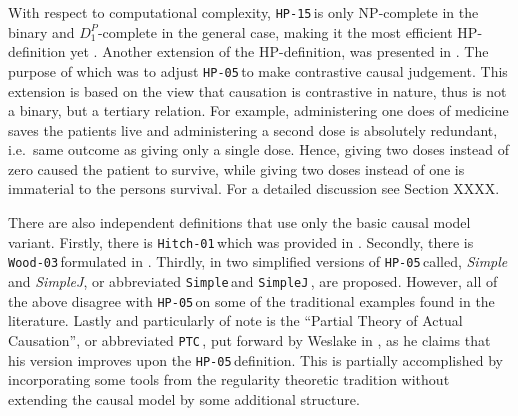 \documentclass[11pt,a4paper]{book}
\theoremstyle{definition}
\theoremstyle{definition}
\theoremstyle{definition}
\theoremstyle{remark}
\newcommand{\hitch}{\texttt{Hitch-01}\,}
\newcommand{\wood}{\texttt{Wood-03}\,}
\newcommand{\hpu}{\texttt{HP-05}\,}
\newcommand{\simple}{\texttt{Simple}\,}
\newcommand{\simplej}{\texttt{SimpleJ}\,}
\newcommand{\ptc}{\texttt{PTC}\,}
\newcommand{\hpm}{\texttt{HP-15}\,}
\begin{document}
With respect to computational complexity, \hpm is only NP-complete in the binary and $D_1^P$-complete in the general case, making it the most efficient HP-definition yet \parencite[p.~153-154]{halpern2016actual}.
Another extension of the HP-definition, was presented in \parencite{fenton2017proposed}. The purpose of which was to adjust \hpu to make contrastive causal judgement.
This extension is based on the view that causation is contrastive in nature, thus is not a binary, but a tertiary relation. For example, administering one does of medicine saves the patients live and administering a second dose is absolutely redundant, i.e.\ same outcome as giving only a single dose. Hence, giving two doses instead of zero caused the patient to survive, while giving two doses instead of one is immaterial to the persons survival. For a detailed discussion see Section XXXX.


There are also independent definitions that use only the basic causal model variant.
Firstly, there is \hitch which was provided in \parencite{hitchcock2001intransitivity}. Secondly, there is \wood formulated in \parencite{woodward2005making}.
Thirdly, in \parencite{glymour2010actual} two simplified versions of \hpu called, \emph{Simple} and \emph{SimpleJ}, or abbreviated \simple and \simplej, are proposed. 
However, all of the above disagree with \hpu on some of the traditional examples found in the literature. 
Lastly and particularly of note is the ``Partial Theory of Actual Causation'', or abbreviated \ptc, put forward by Weslake in \parencite{weslake2015partial}, as he claims that his version improves upon the \hpu definition. This is partially accomplished by incorporating some tools from the regularity theoretic tradition without extending the causal model by some additional structure.
\end{document}

